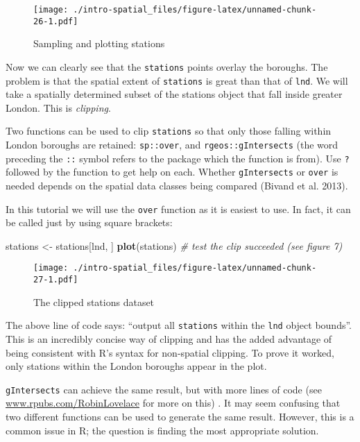 \documentclass[]{article}
\newenvironment{Shaded}{}{}
\newcommand{\KeywordTok}[1]{\textcolor[rgb]{0.00,0.44,0.13}{\textbf{{#1}}}}
\newcommand{\StringTok}[1]{\textcolor[rgb]{0.25,0.44,0.63}{{#1}}}
\newcommand{\CommentTok}[1]{\textcolor[rgb]{0.38,0.63,0.69}{\textit{{#1}}}}
\newcommand{\NormalTok}[1]{{#1}}
\begin{document}
\begin{figure}[htbp]
\centering
\texttt{[image: ./intro-spatial\_files/figure-latex/unnamed-chunk-26-1.pdf]}
\caption{Sampling and plotting stations}
\end{figure}

Now we can clearly see that the \texttt{stations} points overlay the
boroughs. The problem is that the spatial extent of \texttt{stations} is
great than that of \texttt{lnd}. We will take a spatially determined
subset of the stations object that fall inside greater London. This is
\emph{clipping}.

Two functions can be used to clip \texttt{stations} so that only those
falling within London boroughs are retained: \texttt{sp::over}, and
\texttt{rgeos::gIntersects} (the word preceding the \texttt{::} symbol
refers to the package which the function is from). Use \texttt{?}
followed by the function to get help on each. Whether
\texttt{gIntersects} or \texttt{over} is needed depends on the spatial
data classes being compared (Bivand et al. 2013).

In this tutorial we will use the \texttt{over} function as it is easiest
to use. In fact, it can be called just by using square brackets:

\begin{Shaded}
\begin{Highlighting}[]
\NormalTok{stations <-}\StringTok{ }\NormalTok{stations[lnd, ]}
\KeywordTok{plot}\NormalTok{(stations) }\CommentTok{# test the clip succeeded (see figure 7)}
\end{Highlighting}
\end{Shaded}

\begin{figure}[htbp]
\centering
\texttt{[image: ./intro-spatial\_files/figure-latex/unnamed-chunk-27-1.pdf]}
\caption{The clipped stations dataset}
\end{figure}

The above line of code says: ``output all \texttt{stations} within the
\texttt{lnd} object bounds''. This is an incredibly concise way of
clipping and has the added advantage of being consistent with R's syntax
for non-spatial clipping. To prove it worked, only stations within the
London boroughs appear in the plot.

\texttt{gIntersects} can achieve the same result, but with more lines of
code (see
\href{http://www.rpubs.com/RobinLovelace/11796}{www.rpubs.com/RobinLovelace}
for more on this) . It may seem confusing that two different functions
can be used to generate the same result. However, this is a common issue
in R; the question is finding the most appropriate solution.
\end{document}
